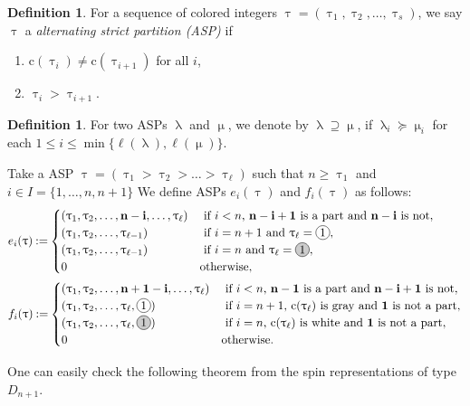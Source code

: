 \documentclass[11pt, leqno]{amsart}
\theoremstyle{plain}
\theoremstyle{definition}
\newtheorem{definition}[theorem]{Definition}
\numberwithin{equation}{section}
\newcommand{\seteq}{\mathbin{:=}}
\newcommand{\cn}[1]{\mathbf{#1}}
\newcommand{\clr}{\mathrm{c}}
\newcommand{\blam}{\uplambda}
\newcommand{\btau}{\uptau}
\newcommand{\bmu}{\upmu}
\newcommand{\ASP}{\mathrm{ASP}}
\newcommand*\gn[1]{\tikz[baseline=(char.base)]{%
            \node[shape=circle,fill=gray!40,draw,inner sep=1.3pt] (char) {#1};}}
\newcommand*\nn[1]{\tikz[baseline=(char.base)]{%
            \node[shape=circle,draw,inner sep=1.3pt] (char) {#1};}}
\newcommand{\defn}[1]{{\color{darkred}\emph{#1}}} %
\begin{document}
\begin{definition} For a sequence of colored integers $\uptau=(\uptau_1,\uptau_2,\ldots,\uptau_s)$, we say
$\uptau$ a \defn{alternating strict partition (ASP)} if
\begin{enumerate}
\item $\clr(\uptau_i) \ne \clr(\uptau_{i+1})$ for all $i$,
\item $\uptau_i > \uptau_{i+1}$.
\end{enumerate}
\end{definition}

\begin{definition} For two $\ASP$s $\blam$ and $\bmu$, we denote by $\blam \supseteq \bmu$, if
$\blam_i \succeq \bmu_i$ for each $1 \le i \le \min\{ \ell(\blam),\ell(\bmu) \}$.
\end{definition}

Take a ASP $\btau= (\btau_1 > \btau_2 > \ldots > \btau_\ell)$ such that $n \ge \btau_1$ and $i \in I=\{ 1,\ldots,n,n+1\}$
We define ASPs $e_i(\btau)$ and $f_i(\btau)$ as follows:
\begin{align*}
&e_i(\btau) \seteq \begin{cases}
(\btau_1,\btau_2,\ldots,\cn{n}-\cn{i},\ldots,\btau_\ell) & \text{ if $i<n$, $\cn{n}-\cn{i}+\cn{1}$ is a part and $\cn{n}-\cn{i}$ is not}, \\
(\btau_1,\btau_2,\ldots,\btau_{\ell-1})& \text{ if $i=n+1$ and  $\btau_\ell=\nn{1}$}, \\
(\btau_1,\btau_2,\ldots,\btau_{\ell-1})& \text{ if $i=n$ and  $\btau_\ell=\gn{1}$}, \\
0 & \text{otherwise},
\end{cases} \allowdisplaybreaks \\
& f_i(\btau) \seteq \begin{cases}
(\btau_1,\btau_2,\ldots,\cn{n}+\cn{1}-\cn{i},\ldots,\btau_\ell) & \text{ if $i<n$, $\cn{n}-\cn{1}$ is a part and $\cn{n}-\cn{i}+\cn{1}$ is not}, \\
(\btau_1,\btau_2,\ldots,\btau_\ell,\nn{1})& \text{ if $i=n+1$, $\clr(\btau_\ell)$ is gray and $\cn{1}$ is not a part}, \\
(\btau_1,\btau_2,\ldots,\btau_\ell,\gn{1})& \text{ if $i=n$, $\clr(\btau_\ell)$ is white and $\cn{1}$ is not a part}, \\
0 & \text{otherwise}.
\end{cases}
\end{align*}

One can easily check the following theorem from the spin representations of type $D_{n+1}$.
\end{document}
